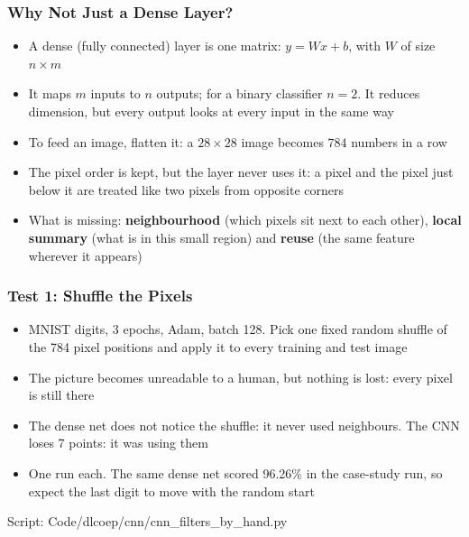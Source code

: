 \begin{frame}[fragile] \frametitle{Why Not Just a Dense Layer?}
\begin{itemize}
\item A dense (fully connected) layer is one matrix: $y = Wx + b$, with $W$ of size $n \times m$
\item It maps $m$ inputs to $n$ outputs; for a binary classifier $n = 2$. It reduces dimension, but every output looks at every input in the same way
\item To feed an image, flatten it: a $28 \times 28$ image becomes $784$ numbers in a row
\item The pixel order is kept, but the layer never uses it: a pixel and the pixel just below it are treated like two pixels from opposite corners
\item What is missing: \textbf{neighbourhood} (which pixels sit next to each other), \textbf{local summary} (what is in this small region) and \textbf{reuse} (the same feature wherever it appears)
\end{itemize}
\end{frame}

\begin{frame}[fragile] \frametitle{Test 1: Shuffle the Pixels}
\begin{itemize}
\item MNIST digits, 3 epochs, Adam, batch 128. Pick one fixed random shuffle of the 784 pixel positions and apply it to every training and test image
\item The picture becomes unreadable to a human, but nothing is lost: every pixel is still there
\end{itemize}
\begin{center}
\small
{}
\end{center}
\begin{itemize}
\item The dense net does not notice the shuffle: it never used neighbours. The CNN loses 7 points: it was using them
\item One run each. The same dense net scored 96.26\% in the case-study run, so expect the last digit to move with the random start
\end{itemize}
{\tiny Script: Code/dlcoep/cnn/cnn\_filters\_by\_hand.py}
\end{frame}

